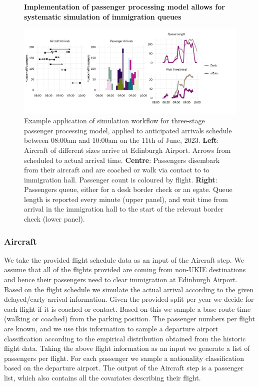 \documentclass[10pt]{article}
\newcommand*{\figuretitle}[1]{%
    {\centering%
    \textbf{#1}%
    \par\medskip}%
}
\begin{document}
\begin{figure}[!ht]
    \centering
    \figuretitle{Implementation of passenger processing model allows for systematic simulation of immigration queues}
    \includegraphics[width=1.1\textwidth]{figures/workflow_fig.png}
     \caption{Example application of simulation workflow for three-stage passenger processing model, applied to anticipated arrivals schedule between 08:00am and 10:00am on the 11th of June, 2023. \textbf{Left}: Aircraft of different sizes arrive at Edinburgh Airport. Arrows from scheduled to actual arrival time. \textbf{Centre}: Passengers disembark from their aircraft and are coached or walk via contact to to immigration hall. Passenger count is coloured by flight. \textbf{Right}: Passengers queue, either for a desk border check or an \gls{egate}. Queue length is reported every minute (upper panel), and wait time from arrival in the immigration hall to the start of the relevant border check (lower panel).} \label{fig:workflow_fig}
\end{figure}

\subsubsection{Aircraft}
We take the provided flight schedule data as an input of the Aircraft step. We assume that all of the flights provided are coming from non-UKIE destinations and hence their passengers need to clear immigration at Edinburgh Airport. Based on the flight schedule we simulate the actual arrival according to the given delayed/early arrival information. Given the provided split per year we decide for each flight if it is coached or contact. Based on this we sample a base route time (walking or coached) from the parking position. The passenger numbers per flight are known, and we use this information to sample a departure airport classification according to the empirical distribution obtained from the historic flight data. Taking the above flight information as an input we generate a list of passengers per flight. For each passenger we sample a nationality classification based on the departure airport. The output of the Aircraft step is a passenger list, which also contains all the covariates describing their flight.
\end{document}
